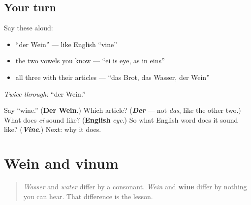 \subsection*{Your turn}
Say these aloud:

\begin{itemize}
\raggedright
  \item \textquotedblleft{}der Wein\textquotedblright{} — like English \textquotedblleft{}vine\textquotedblright{}
  \item the two vowels you know — \textquotedblleft{}ei is eye, as in eins\textquotedblright{}
  \item all three with their articles — \textquotedblleft{}das Brot, das Wasser, der Wein\textquotedblright{}
\end{itemize}

\emph{Twice through:} \textquotedblleft{}der Wein.\textquotedblright{}

\begin{tcolorbox}[breakable,colback=teal!4,colframe=teal!35!black,title={Before you move on}]
Say \textquotedblleft{}wine.\textquotedblright{} (\textbf{Der Wein}.) Which article? (\emph{\textbf{Der}} — not \emph{das}, like the other two.) What does \emph{ei} sound like? (\textbf{English} \emph{eye}.) So what English word does it sound like? (\emph{\textbf{Vine}}.) Next: why it does.
\end{tcolorbox}
\section[Wein und vinum]{Wein and vinum}

\label{lesson:GE-C11-wein-vinum}



\begin{quote}
\emph{Wasser} and \emph{water} differ by a consonant. \emph{Wein} and \textbf{wine} differ by nothing you can hear. That difference is the lesson.
\end{quote}

